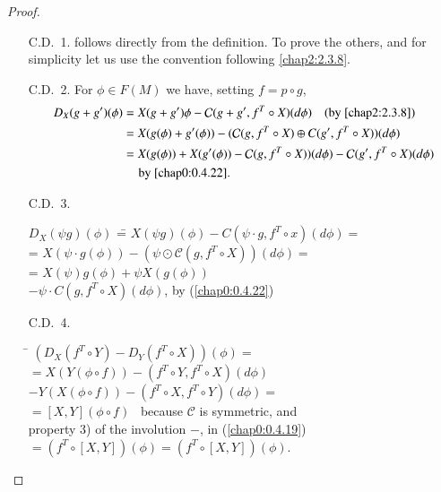 \begin{proof}
\quad 
\begin{itemize}
\item[C.D.~1.] follows directly from the definition. To
  prove \pageoriginale the others, and 
for simplicity let us use the convention following \eqref{chap2:2.3.8}.

\item[C.D.~2.] For $\phi\in F(M)$ we have, setting $f=p\circ g$,
{\fontsize{9}{11}\selectfont
\begin{align*}
D_{X}(g+g')(\phi) &= X(g+g')\phi-\mathcal{C}(g+g',f^{T}\circ
X)(d\phi)\quad\text{(by \eqref{chap2:2.3.8})}\\
&= X(g(\phi)+g'(\phi))-(\mathcal{C}(g,f^{T}\circ X)\oplus
C(g',f^{T}\circ X))(d\phi)\\
&= X(g(\phi))+X(g'(\phi))-\mathcal{C}(g,f^{T}\circ
X))(d\phi)-\mathcal{C}(g',f^{T}\circ X)(d\phi)\\
&\quad \text{ by \ref{chap0:0.4.22}}.
\end{align*}}\relax

\item[C.D.~3.] \begin{tabbing}
               $D_{X}(\psi g)(\phi)$ \= = $X(\psi g)(\phi)-C(\psi\cdot
  g,f^{T}\circ x)(d\phi)=$\\[5pt]
  \> = $X(\psi\cdot g(\phi))-(\psi\odot \mathcal{C}(g,f^{T}\circ
  X))(d\phi)=$\\[5pt]
  \> = $X(\psi)g(\phi)+\psi X(g(\phi))$\\[5pt]
  \> $-\psi\cdot C(g,f^{T}\circ X)(d\phi)$, by (\ref{chap0:0.4.22})
\end{tabbing}

\item[C.D.~4.] \begin{tabbing}
\= $(D_{X}(f^{T}\circ Y)-D_{Y}(f^{T}\circ
  X))(\phi)=$\\[5pt]
  \>$=X(Y(\phi\circ f))-(f^{T}\circ Y, f^{T}\circ X)(d\phi)$\\[5pt]
  \>$-Y(X(\phi\circ f))-(f^{T}\circ X,f^{T}\circ Y)(d\phi)=$\\[5pt]
  \>$=[X,Y](\phi\circ f)$ \ because $\mathcal{C}$ is symmetric,
  and\\[5pt]
  \>\quad property 3) of the involution $-$, in (\ref{chap0:0.4.19})\\[5pt]
  \>$=(f^{T}\circ[X,Y])(\phi)=(f^{T}\circ[X,Y])(\phi)$.
\end{tabbing}
\end{itemize}
\end{proof}

